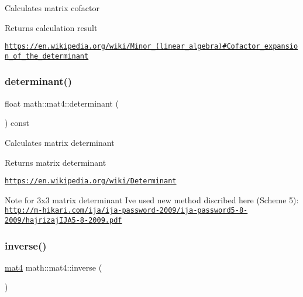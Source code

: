Calculates matrix cofactor \begin{DoxyReturn}{Returns}
calculation result
\end{DoxyReturn}
\href{https://en.wikipedia.org/wiki/Minor_(linear_algebra)#Cofactor_expansion_of_the_determinant}{\tt https\+://en.\+wikipedia.\+org/wiki/\+Minor\+\_\+(linear\+\_\+algebra)\#\+Cofactor\+\_\+expansion\+\_\+of\+\_\+the\+\_\+determinant} \mbox{\label{structmath_1_1mat4_a743a3f8bbeda33bae529ef7d5e3d9d0c}} 
\subsubsection{\texorpdfstring{determinant()}{determinant()}}
{\footnotesize\ttfamily float math\+::mat4\+::determinant (\begin{DoxyParamCaption}{ }\end{DoxyParamCaption}) const\hspace{0.3cm}{\ttfamily [inline]}}

Calculates matrix determinant \begin{DoxyReturn}{Returns}
matrix determinant
\end{DoxyReturn}
\href{https://en.wikipedia.org/wiki/Determinant}{\tt https\+://en.\+wikipedia.\+org/wiki/\+Determinant} \begin{DoxyNote}{Note}
for 3x3 matrix determinant I\textquotesingle{}ve used new method discribed here (Scheme 5)\+: \href{http://m-hikari.com/ija/ija-password-2009/ija-password5-8-2009/hajrizajIJA5-8-2009.pdf}{\tt http\+://m-\/hikari.\+com/ija/ija-\/password-\/2009/ija-\/password5-\/8-\/2009/hajrizaj\+I\+J\+A5-\/8-\/2009.\+pdf} 
\end{DoxyNote}
\mbox{\label{structmath_1_1mat4_a04aa308993896a68a5aac858b41edb7e}} 
\subsubsection{\texorpdfstring{inverse()}{inverse()}}
{\footnotesize\ttfamily \hyperlink{structmath_1_1mat4}{mat4} math\+::mat4\+::inverse (\begin{DoxyParamCaption}{ }\end{DoxyParamCaption})\hspace{0.3cm}{\ttfamily [inline]}}

